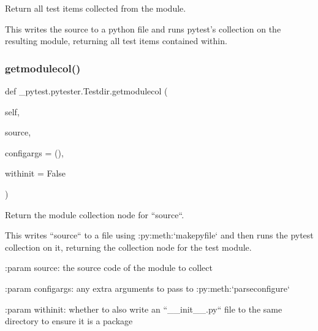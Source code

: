 \begin{DoxyVerb}Return all test items collected from the module.

This writes the source to a python file and runs pytest's collection on
the resulting module, returning all test items contained within.\end{DoxyVerb}
 \mbox{\label{class__pytest_1_1pytester_1_1_testdir_ad1f5a7300fc126a2e434f2b3cba4dcdc}} 
\subsubsection{\texorpdfstring{getmodulecol()}{getmodulecol()}}
{\footnotesize\ttfamily def \+\_\+pytest.\+pytester.\+Testdir.\+getmodulecol (\begin{DoxyParamCaption}\item[{}]{self,  }\item[{}]{source,  }\item[{}]{configargs = {\ttfamily ()},  }\item[{}]{withinit = {\ttfamily False} }\end{DoxyParamCaption})}

\begin{DoxyVerb}Return the module collection node for ``source``.

This writes ``source`` to a file using :py:meth:`makepyfile` and then
runs the pytest collection on it, returning the collection node for the
test module.

:param source: the source code of the module to collect

:param configargs: any extra arguments to pass to
    :py:meth:`parseconfigure`

:param withinit: whether to also write an ``__init__.py`` file to the
    same directory to ensure it is a package\end{DoxyVerb}
 \mbox{\label{class__pytest_1_1pytester_1_1_testdir_af9e60f840e1eeaa260f1fd64b636cbe7}} 
